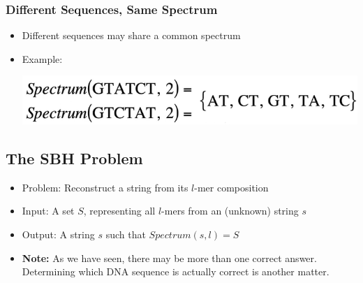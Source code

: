 \documentclass[10pt]{article}
\begin{document}
\subsubsection*{Different Sequences, Same Spectrum}
\begin{itemize}
    \item Different sequences may share a common spectrum
    \item Example:
    \begin{center}
        \includegraphics*[scale=0.8]{W4_10.png}
    \end{center}
\end{itemize}

\subsection*{The SBH Problem}
\begin{itemize}
    \item Problem: Reconstruct a string from its $l$-mer composition
    \item Input: A set $S$, representing all $l$-mers from an (unknown) string $s$
    \item Output: A string $s$ such that $Spectrum(s, l) = S$
    \item \textbf{Note:} As we have seen, there may be more than one correct answer.  Determining which DNA sequence is actually correct is another matter.
\end{itemize}
\end{document}
